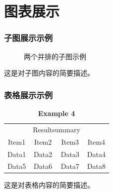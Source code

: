 \documentclass[10pt]{beamer}
\begin{document}
\section{图表展示}
\begin{frame}
\frametitle{子图展示示例}
\begin{figure}
\centering
{}
\hfill
{}
\caption{两个并排的子图示例}
\label{fig:subfigures}
\end{figure}
这是对子图内容的简要描述。
\end{frame}

\begin{frame}
\frametitle{表格展示示例}

\begin{table}[H]
\caption{\textbf{Example 4}}
\centering
\begin{tabular}{cccc}
\toprule
&\multicolumn{2}{c}{Resultsummary}& \\
Item1&Item2&Item3&Item4 \\
\midrule 
Data1&Data2&Data3&Data4 \\
\midrule
Data5&Data6&Data7&Data8 \\
\bottomrule
\end{tabular}
\end{table}


这是对表格内容的简要描述。
\end{frame}
\end{document}
